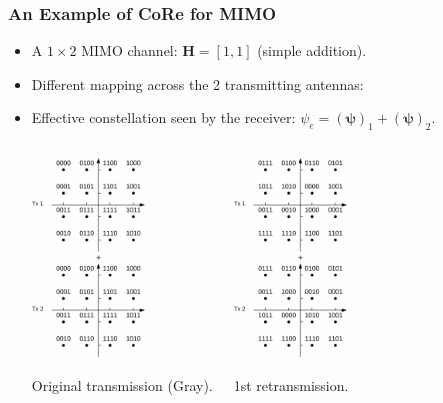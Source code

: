 \documentclass{beamer}
\begin{document}
\begin{frame}
  \frametitle{An Example of CoRe for MIMO}
  \begin{itemize}
    \item A $1\times 2$ MIMO channel: $\mathbf{H} = [1, 1]$ (simple addition).
    \item Different mapping across the 2 transmitting antennas:
    \item Effective constellation seen by the receiver: $\psi_e = (\bm{\psi})_1
    + (\bm{\psi})_2$.
    \begin{columns}
      \begin{center}
        \includegraphics[width=3cm]{figs/16QAM_Gray_iq.pdf}
        
        Original transmission (Gray).
      \end{center}
      
      \begin{center}
        \includegraphics[width=3cm]{figs/16QAM_Gray_iq_1.pdf}
        
        1st retransmission.
      \end{center}
    \end{columns}
  \end{itemize}
  
\end{frame}

\end{document}
